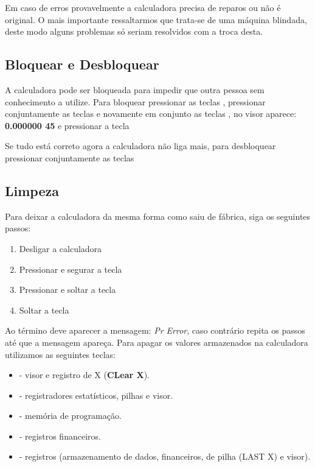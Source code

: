 \begin{theo}{}
	Em caso de erros provavelmente a calculadora precisa de reparos ou não é original. O mais importante ressaltarmos que trata-se de uma máquina blindada, deste modo alguns problemas só seriam resolvidos com a troca desta.
\end{theo}

\subsection*{Bloquear e Desbloquear}
A calculadora pode ser bloqueada para impedir que outra pessoa sem conhecimento a utilize. Para bloquear pressionar as teclas   , pressionar conjuntamente as teclas   e novamente em conjunto as teclas  , no visor aparece: \textbf{0.000000 45} e pressionar a tecla 

Se tudo está correto agora a calculadora não liga mais, para desbloquear pressionar conjuntamente as teclas  

\subsection*{Limpeza}
Para deixar a calculadora da mesma forma como saiu de fábrica, siga os seguintes passos: \vspace{-1em}
\begin{enumerate}
	\item Desligar a calculadora
	\item Pressionar e segurar a tecla \keystroke{$-$}
	\item Pressionar e soltar a tecla 
	\item Soltar a tecla \keystroke{$-$}
\end{enumerate}

Ao término deve aparecer a mensagem: \textit{Pr Error}, caso contrário repita os passos até que a mensagem apareça. Para apagar os valores armazenados na calculadora utilizamos as seguintes teclas: \vspace{-1em}
\begin{itemize}
	\item {} - visor e registro de X (\textbf{CLear X}).
	\item {} \keystroke{$\sum$} - registradores estatísticos, pilhas e visor.
	\item {}  - memória de programação.
	\item {}  - registros financeiros.
	\item {}  - registros (armazenamento de dados, financeiros, de pilha (LAST X) e visor).
\end{itemize}

